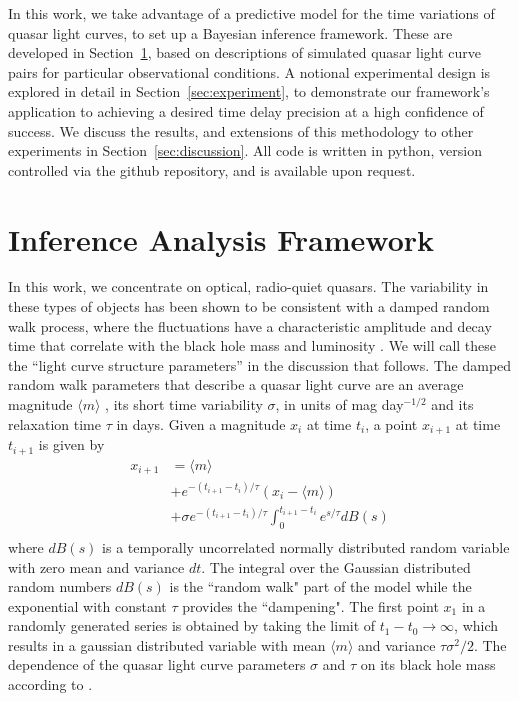 \documentclass{emulateapj}
\begin{document}
In this work, we take advantage of a predictive model for the time
variations of quasar light curves, to set up a Bayesian inference
framework.  These are developed in Section~\ref{sec:tdanalysis}, based
on descriptions of simulated quasar light curve pairs for particular
observational conditions.  A notional experimental design is explored
in detail in Section~\ref{sec:experiment}, to demonstrate our
framework's application to achieving a desired time delay precision at
a high confidence of success.  We discuss the results, and extensions
of this methodology to other experiments in
Section~\ref{sec:discussion}.  All code is written in python, version
controlled via the github repository, and is available upon request.

\section{Inference Analysis Framework}\label{sec:tdanalysis}

In this work, we concentrate on optical, radio-quiet quasars. The
variability in these types of objects has been shown to be consistent
with a damped random walk process, where the fluctuations have a
characteristic amplitude and decay time that correlate with the black
hole mass and luminosity \citep{Kelly2009a}.  We will call these the
``light curve structure parameters'' in the discussion that
follows. 
The damped random walk parameters that describe a quasar light 
curve are an average magnitude $\langle m \rangle$ , its short time variability $\sigma$, in units of mag day$^{-1/2}$
and its relaxation time $\tau$ in days. Given a magnitude $x_i$ at time $t_i$, a point $x_{i+1}$ at time $t_{i+1}$ is given by
\begin{equation}
\begin{split}
x_{i+1}&  =  \langle m \rangle  \\
&+ e^{-(t_{i+1}-t_i)/\tau}\left(x_{i}-\langle m \rangle\right)\\
&+ \sigma e^{-(t_{i+1}-t_i)/\tau}\int_{0}^{t_{i+1}-t_{i}}e^{s/\tau}dB(s)\\
\end{split}
\label{eq:generative}
\end{equation} 
where $dB(s)$ is a temporally uncorrelated normally distributed random variable with zero mean and variance $dt$. The integral over
the Gaussian distributed random numbers $dB(s)$ is the ``random walk" part of the model while the exponential with constant $\tau$ provides
the ``dampening".
The first point $x_1$ in a randomly generated series is obtained by taking the limit of
$t_1-t_0\to\infty$, which results in a gaussian distributed variable with mean $\langle m \rangle$ and variance $\tau\sigma^2/2$.
The dependence of the quasar light curve parameters $\sigma$ and $\tau$ on its black hole mass according to \citep{Kelly2009a}.
\end{document}
